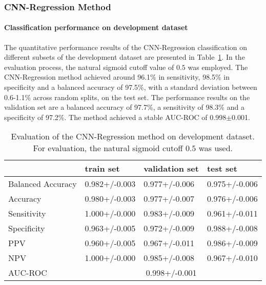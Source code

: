 \subsubsection{CNN-Regression Method}
\label{subsubsec:eval_regression}



\paragraph{Classification performance on development dataset}

The quantitative performance results of the CNN-Regression classification on 
different subsets of the development dataset are presented in Table~\ref{t1:cnn_regression_perf_eval_table}.
In the evaluation process, the natural sigmoid cutoff value of $0.5$ was employed.
The CNN-Regression method achieved around 96.1\% in sensitivity, 98.5\% in specificity and a balanced accuracy of 97.5\%, 
with a standard deviation between 0.6-1.1\% across random splits, on the test set.
The performance results on the validation set are a balanced accuracy of 97.7\%, a sensitivity of 98.3\% 
and a specificity of 97.2\%.
The method achieved a stable AUC-ROC of 0.998$\pm$0.001.


\begin{table}[ht]
  \caption{Evaluation of the CNN-Regression method on development dataset. 
  For evaluation, the natural sigmoid cutoff $0.5$ was used.}
  \centering
  \begin{tabular}{llll}
      \hline
                        & train set         & validation set      & test set             \\
      \hline
      Balanced Accuracy & 0.982+/-0.003   &  0.977+/-0.006    &  0.975+/-0.006 \\
      Accuracy          & 0.980+/-0.003     &   0.977+/-0.007   &  0.976+/-0.006  \\
      Sensitivity       &  1.000+/-0.000   &   0.983+/-0.009   &  0.961+/-0.011 \\
      Specificity       &   0.963+/-0.005  &   0.972+/-0.009 &   0.988+/-0.008 \\
      PPV               &  0.960+/-0.005    &   0.967+/-0.011  &  0.986+/-0.009  \\
      NPV               &  1.000+/-0.000  &   0.985+/-0.008   & 0.967+/-0.010 \\
      \hline
      AUC-ROC          &  \multicolumn{3}{c}{0.998+/-0.001}  \\
      \hline
  \end{tabular}
 \label{t1:cnn_regression_perf_eval_table}
\end{table}


